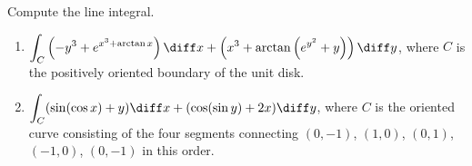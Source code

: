 Compute the line integral.

\begin{enumerate}
\item $\displaystyle \int_{C} \left(-y^3 +e^{x^3+\arctan x} \right)\diff x + \left(x^3+ \arctan\left(e^{y^2}+y \right) \right)\diff y $, where $C$ is the positively oriented boundary of the unit disk.
\item $\displaystyle \int_{C} (\sin (\cos x) +y )\diff x +(\cos (\sin y)+2x)\diff y $, where $C$ is the oriented curve consisting of the four segments connecting $(0,-1)$, $(1,0)$, $(0,1)$, $(-1,0)$, $(0,-1)$ in this order.
\end{enumerate}